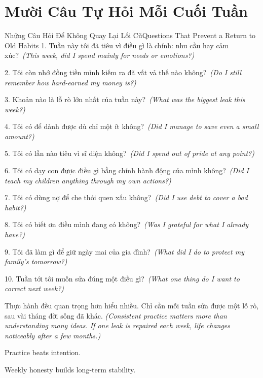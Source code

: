 \section*{Mười Câu Tự Hỏi Mỗi Cuối Tuần}
\begin{truyen}{Những Câu Hỏi Để Không Quay Lại Lối Cũ}{Questions That Prevent a Return to Old Habits}
1. Tuần này tôi đã tiêu vì điều gì là chính: nhu cầu hay cảm xúc?\
\textit{(This week, did I spend mainly for needs or emotions?)}

2. Tôi còn nhớ đồng tiền mình kiếm ra đã vất vả thế nào không?\
\textit{(Do I still remember how hard-earned my money is?)}

3. Khoản nào là lỗ rò lớn nhất của tuần này?\
\textit{(What was the biggest leak this week?)}

4. Tôi có để dành được dù chỉ một ít không?\
\textit{(Did I manage to save even a small amount?)}

5. Tôi có lần nào tiêu vì sĩ diện không?\
\textit{(Did I spend out of pride at any point?)}

6. Tôi có dạy con được điều gì bằng chính hành động của mình không?\
\textit{(Did I teach my children anything through my own actions?)}

7. Tôi có dùng nợ để che thói quen xấu không?\
\textit{(Did I use debt to cover a bad habit?)}

8. Tôi có biết ơn điều mình đang có không?\
\textit{(Was I grateful for what I already have?)}

9. Tôi đã làm gì để giữ ngày mai của gia đình?\
\textit{(What did I do to protect my family’s tomorrow?)}

10. Tuần tới tôi muốn sửa đúng một điều gì?\
\textit{(What one thing do I want to correct next week?)}
\end{truyen}

\begin{baihoc}
Thực hành đều quan trọng hơn hiểu nhiều. Chỉ cần mỗi tuần sửa được một lỗ rò, sau vài tháng đời sống đã khác.
\textit{(Consistent practice matters more than understanding many ideas. If one leak is repaired each week, life changes noticeably after a few months.)}
\end{baihoc}

\begin{ghinhoanh}
Practice beats intention.

Weekly honesty builds long-term stability.
\end{ghinhoanh}

\ngancach